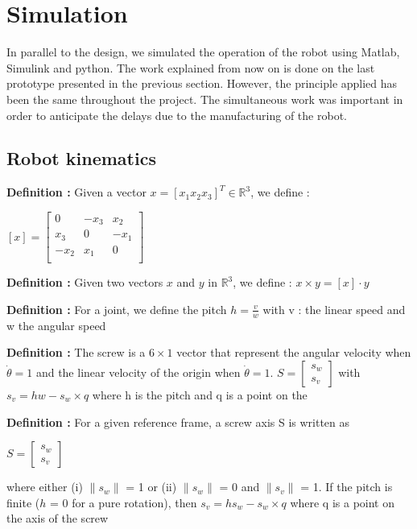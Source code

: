 \section{Simulation}

\hspace{\parindent} In parallel to the design, we simulated the operation of the robot using Matlab, Simulink and python. The work explained from now on is done on the last prototype presented in the previous section. However, the principle applied has been the same throughout the project. The simultaneous work was important in order to anticipate the delays due to the manufacturing of the robot. 

\subsection{Robot kinematics}

\textbf{Definition :} Given a vector $x=[x_1 x_2 x_3]^T \in \mathbb{R}^3$, we define : 
\begin{center}
    $[x] = \begin{bmatrix}
        0 & -x_3 & x_2 \\
        x_3 & 0 & -x_1 \\
        -x_2 & x_1 & 0 \\
    \end{bmatrix}$
\end{center}

\noindent\textbf{Definition :} Given two vectors $x$ and $y$ in $\mathbb{R}^3$, we define : $x\times y = [x]\cdot y$

\bigbreak

\noindent\textbf{Definition :} For a joint, we define the pitch $h = \frac{v}{w}$ with v : the linear speed and w the angular speed

\bigbreak

\noindent\textbf{Definition :} The screw is a $6\times1$ vector that represent the angular velocity when $\dot{\theta}=1$ and the linear velocity of the origin when $\dot{\theta}=1$. $S = \begin{bmatrix} s_w\\s_v\end{bmatrix}$ with $s_v = hw-s_w\times q$ where h is the pitch and q is a point on the 

\noindent\textbf{Definition :} For a given reference frame, a screw axis S is written as 
\begin{center}
    $S=\begin{bmatrix}
        s_w\\s_v
    \end{bmatrix}$
\end{center}
where either (i) $\|s_w\|$ = 1 or (ii) $\|s_w\|$ = 0 and $\|s_v\|$ = 1. If the pitch is finite ($h$ = 0 for a pure rotation), then $s_v = hs_w-s_w\times q$ where q is a point on the axis of the screw

